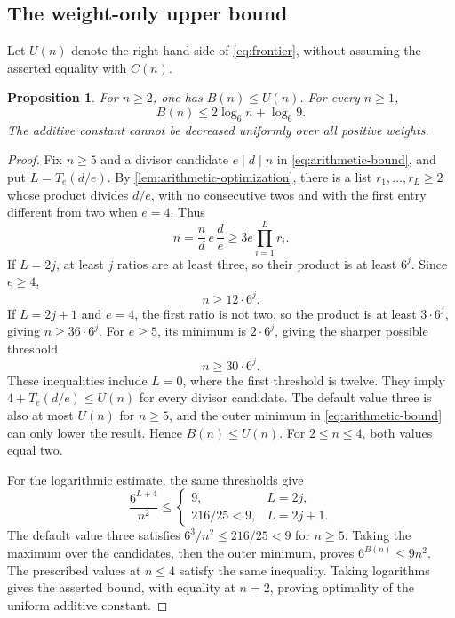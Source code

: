 \documentclass[11pt,a4paper]{amsart}
\numberwithin{equation}{section}
\theoremstyle{plain}
\newtheorem{proposition}[theorem]{Proposition}
\theoremstyle{definition}
\begin{document}
\subsection{The weight-only upper bound}
Let \(U(n)\) denote the right-hand side of \eqref{eq:frontier}, without
assuming the asserted equality with \(C(n)\).

\begin{proposition}\label{prop:logarithmic-cutoff}
For \(n\ge2\), one has \(B(n)\le U(n)\).  For every \(n\ge1\),
\[
B(n)\le2\log_6 n+\log_6 9.
\]
The additive constant cannot be decreased uniformly over all positive weights.
\end{proposition}
\begin{proof}
Fix \(n\ge5\) and a divisor candidate \(e\mid d\mid n\) in
\eqref{eq:arithmetic-bound}, and put \(L=T_e(d/e)\).
By \cref{lem:arithmetic-optimization}, there is a list
\(r_1,\ldots,r_L\ge2\) whose product divides \(d/e\), with no consecutive
twos and with the first entry different from two when \(e=4\).
Thus
\[
n=\frac nd\,e\,\frac de\ge3e\prod_{i=1}^L r_i.
\]
If \(L=2j\), at least \(j\) ratios are at least three, so their product
is at least \(6^j\).  Since \(e\ge4\),
\begin{equation}\label{eq:even-threshold}
n\ge12\cdot6^j.
\end{equation}
If \(L=2j+1\) and \(e=4\), the first ratio is not two, so the product is at
least \(3\cdot6^j\), giving \(n\ge36\cdot6^j\).  For \(e\ge5\), its minimum
is \(2\cdot6^j\), giving the sharper possible threshold
\begin{equation}\label{eq:odd-threshold}
n\ge30\cdot6^j.
\end{equation}
These inequalities include \(L=0\), where the first threshold is twelve.
They imply \(4+T_e(d/e)\le U(n)\) for every divisor candidate.
The default value three is also at most \(U(n)\) for \(n\ge5\), and the
outer minimum in \eqref{eq:arithmetic-bound} can only lower the result.
Hence \(B(n)\le U(n)\).  For \(2\le n\le4\), both values equal two.

For the logarithmic estimate, the same thresholds give
\[
\frac{6^{L+4}}{n^2}\le
\begin{cases}
9,&L=2j,\\
216/25<9,&L=2j+1.
\end{cases}
\]
The default value three satisfies \(6^3/n^2\le216/25<9\) for \(n\ge5\).
Taking the maximum over the candidates, then the outer minimum, proves
\(6^{B(n)}\le9n^2\).  The prescribed values at \(n\le4\) satisfy the
same inequality.  Taking logarithms gives the asserted bound, with
equality at \(n=2\), proving optimality of the uniform additive constant.
\end{proof}
\end{document}
